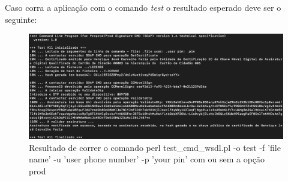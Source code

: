 \newpage
Caso corra a aplicação com o comando \textit{test} o resultado esperado deve ser o seguinte:
\begin{figure}[H]

  \centering
  \captionsetup{justification=centering}

  \includegraphics[scale = 0.25]{resultado.png}
  
  \caption {Resultado de correr o comando perl test\_cmd\_wsdl.pl -o test -f  'file name' -u 'user phone number' -p 'your pin' com ou sem a opção prod}

  \label {fig01}

\end{figure}